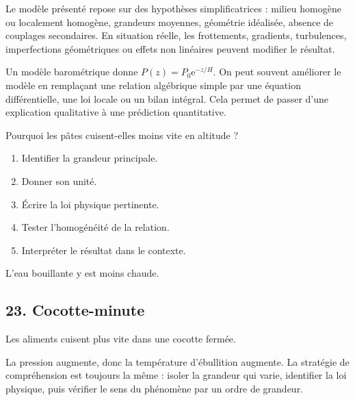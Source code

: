 \documentclass[11pt,a4paper]{article}
\newcommand{\e}{\mathrm e}
\begin{document}
\begin{attentionbox}
Le modèle présenté repose sur des hypothèses simplificatrices : milieu homogène ou localement homogène, grandeurs moyennes, géométrie idéalisée, absence de couplages secondaires. En situation réelle, les frottements, gradients, turbulences, imperfections géométriques ou effets non linéaires peuvent modifier le résultat.
\end{attentionbox}

\begin{approfondissementbox}
Un modèle barométrique donne $P(z)=P_0\e^{-z/H}$.
On peut souvent améliorer le modèle en remplaçant une relation algébrique simple par une équation différentielle, une loi locale ou un bilan intégral. Cela permet de passer d'une explication qualitative à une prédiction quantitative.
\end{approfondissementbox}

\begin{exercicebox}
Pourquoi les pâtes cuisent-elles moins vite en altitude ?
\begin{enumerate}
  \item Identifier la grandeur principale.
  \item Donner son unité.
  \item Écrire la loi physique pertinente.
  \item Tester l'homogénéité de la relation.
  \item Interpréter le résultat dans le contexte.
\end{enumerate}
\end{exercicebox}

\begin{corrigebox}[Indication]
L'eau bouillante y est moins chaude.
\end{corrigebox}


\subsection{23. Cocotte-minute}

\begin{exemplebox}
Les aliments cuisent plus vite dans une cocotte fermée.
\end{exemplebox}

\begin{methodebox}
La pression augmente, donc la température d'ébullition augmente.
La stratégie de compréhension est toujours la même : isoler la grandeur qui varie, identifier la loi physique, puis vérifier le sens du phénomène par un ordre de grandeur.
\end{methodebox}
\end{document}
